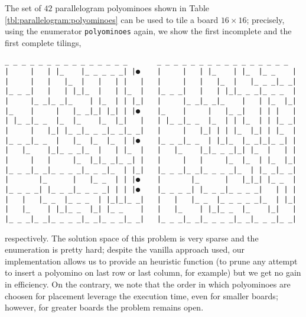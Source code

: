 \begin{example}
The set of $42$ parallelogram polyominoes shown in Table
\ref{tbl:parallelogram:polyominoes} can be used to tile a board $16\times 16$;
precisely, using the enumerator \verb|polyominoes| again, we show the first
incomplete and the first complete tilings,
\iffalse
\begin{verbatim}
>>> size = 16
>>> dim = (size, size)
>>> polys_sols = polyominoes(dim, parallelogram_polyominoes,
...                          availables="ones",
...                          max_depth_reached=40,
...                          pruning=functools.partial(not_insertion_on_edges, size=size))
>>> pretty_tilings = pretty(polys_sols, dim, parallelogram_polyominoes, raw_text=True)
>>> print(next(pretty_tilings))
\end{verbatim}
\fi
\vfill
\begin{Verbatim}[baselinestretch=0.1]
 _ _ _ _ _ _ _ _ _ _ _ _ _ _ _       _ _ _ _ _ _ _ _ _ _ _ _ _ _ _ _
|     |   | |_    |_ _ _ _ _| |●    |     |   | |_    | |_  |_ _    |
|     |   |   |_  |   |   | |   |   |     |   |   |_  |   |_ _ _|_ _|
|_ _ _|   |   | |_|_  |   | |_  |   |_ _ _|   |   | |_|_ _ _|_ _ _  |
|     |_ _|_ _|_    | |_  | | |_|   |     |_ _|_ _|_    |   | |_  |_|
|_    |     |   |_ _|_| |_| | |●    |_    |     |   |_ _|   | | |   |
| |_ _|_ _  |_  |_    |_  |_|   |   | |_ _|_ _  |_  | | |_  | | |_ _|
|     |   |_| |_ _|_ _ _|_ _|_ _|   |     |   |_| | | |_  |_| | |_  |
|_ _ _|_ _  |   |_  |_  |_  | |●    |_ _ _|_ _  | |_|_  |_ _|_|_ _| |
|   |_    |_|_ _ _|_  |   | |_  |   |   |_    |_|_ _ _|_| |_  |   | |
|     |   |     |_  |_|_ _|_ _| |   |     |   |     |_  |_  | |_  |_|
|_ _ _|_ _|_ _ _ _|_ _ _|_  | |_|   |_ _ _|_ _|_ _ _ _|_  | |_ _|_ _|
|       |_      |   |_ _  | | |●    |       |_      |   |_|_| |_ _  |
|_ _ _ _| |_ _ _|_ _ _ _| | | |●    |_ _ _ _| |_ _ _|_ _ _ _|   | | |
|   |   |_ _  |_ _ _  | |_|_|_ _|   |   |   |_ _  |_ _ _ _ _|_  | |_|
|   |_    | |_|_ _  |_| |_ _    |   |   |_    | |_|_ _  |_    |_|   |
|_ _ _|_ _|_ _ _ _|_ _|_ _ _|_ _|   |_ _ _|_ _|_ _ _ _|_ _|_ _ _|_ _|
\end{Verbatim}
respectively. The solution space of this problem is very sparse and the
enumeration is pretty hard; despite the vanilla approach used, our
implementation allows us to provide an heuristic function (to prune any attempt
to insert a polyomino on last row or last column, for example) but we get no
gain in efficiency. On the contrary, we note that the order in which
polyominoes are choosen for placement leverage the execution time, even for
smaller boards; however, for greater boards the problem remains open.
\end{example}

